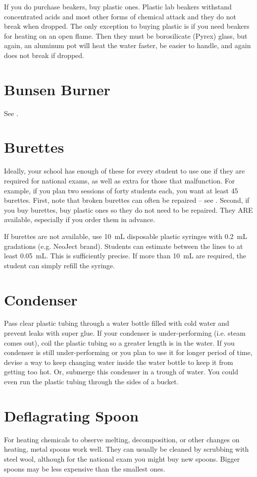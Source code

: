 If you do purchase beakers, 
buy plastic ones. 
Plastic lab beakers withstand concentrated acids 
and most other forms of chemical attack 
and they do not break when dropped. 
The only exception to buying plastic is 
if you need beakers for heating on an open flame. 
Then they must be borosilicate (Pyrex) glass, 
but again, 
an aluminum pot will heat the water faster, 
be easier to handle, 
and again does not break if dropped.

\section{Bunsen Burner}
See .

\section{Burettes}
Ideally, 
your school has enough of these for every student 
to use one if they are required for national exams, 
as well as extra for those that malfunction. 
For example, 
if you plan two sessions of forty students each, 
you want at least 45 burettes. 
First, 
note that broken burettes can often be repaired -- 
see . 
Second, 
if you buy burettes, 
buy plastic ones so they do not need to be repaired. 
They ARE available, 
especially if you order them in advance.

If burettes are not available, 
use 10~mL disposable plastic syringes with 0.2~mL gradations (e.g. 
NeoJect brand). 
Students can estimate between the lines to at least 0.05~mL. 
This is sufficiently precise. 
If more than 10~mL are required, 
the student can simply refill the syringe.

\section{Condenser}
Pass clear plastic tubing through a water bottle filled 
with cold water and prevent leaks with super glue. 
If your condenser is under-performing (i.e. 
steam comes out), 
coil the plastic tubing so a greater length is in the water. 
If you condenser is still under-performing 
or you plan to use it for longer period of time, 
devise a way to keep changing water inside the water bottle 
to keep it from getting too hot. 
Or, 
submerge this condenser in a trough of water. 
You could even run the plastic tubing through the sides of a bucket.

\section{Deflagrating Spoon}
\label{sec:deflagratingspoon}
For heating chemicals to observe melting, 
decomposition, 
or other changes on heating, 
metal spoons work well. 
They can usually be cleaned by scrubbing with steel wool, 
although for the national exam you might buy new spoons. 
Bigger spoons may be less expensive than the smallest ones.

